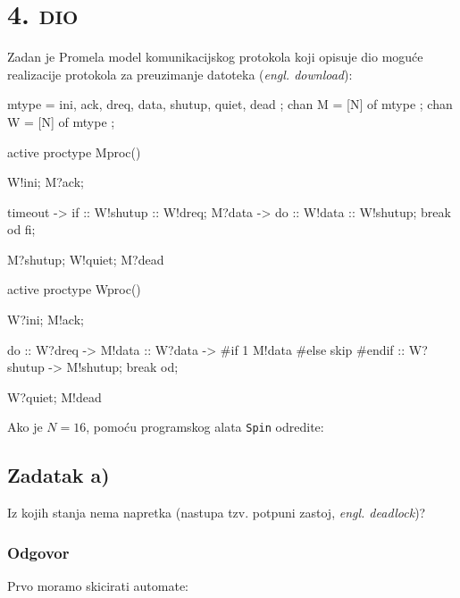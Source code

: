 \documentclass{article}
\newcommand{\sekcija}[1]{\section{\textsc{#1}}}
\newcommand{\dio}[1]{\sekcija{#1. dio}}
\newcommand{\zadatak}[1]{\subsection{Zadatak #1}}
\newcommand{\odgovor}{\subsubsection*{Odgovor}}
\begin{document}
\dio{4}

Zadan je Promela model komunikacijskog protokola koji opisuje dio moguće realizacije protokola za preuzimanje datoteka (\textit{engl. download}):

\begin{ccode}
mtype = { ini, ack, dreq, data, shutup, quiet, dead };
chan M = [N] of { mtype };
chan W = [N] of { mtype };

active proctype Mproc() {
    W!ini;
    M?ack;
    
    timeout ->
        if
            :: W!shutup
            :: W!dreq;
                M?data ->
                    do
                        :: W!data
                        :: W!shutup;
                        break
                    od
        fi;

    M?shutup;
    W!quiet;
    M?dead
}
active proctype Wproc() {
    W?ini;
    M!ack;
    
    do
        :: W?dreq ->
            M!data
        :: W?data ->
            #if 1
            M!data
            #else
            skip
            #endif
        :: W?shutup ->
            M!shutup;
        break
    od;
    
    W?quiet;
    M!dead
}
\end{ccode} \newline

\noindent
Ako je $N = 16$, pomoću programskog alata \texttt{Spin} odredite:

\zadatak{a)}

Iz kojih stanja nema napretka (nastupa tzv. potpuni zastoj, \textit{engl. deadlock})?

\odgovor

Prvo moramo skicirati automate:
\end{document}
